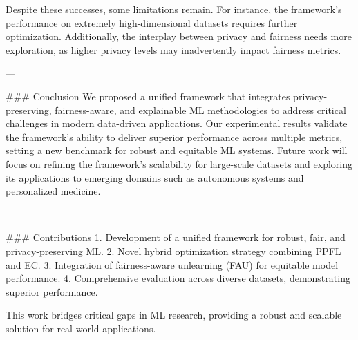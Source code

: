 Despite these successes, some limitations remain. For instance, the framework's performance on extremely high-dimensional datasets requires further optimization. Additionally, the interplay between privacy and fairness needs more exploration, as higher privacy levels may inadvertently impact fairness metrics.

---

### Conclusion  
We proposed a unified framework that integrates privacy-preserving, fairness-aware, and explainable ML methodologies to address critical challenges in modern data-driven applications. Our experimental results validate the framework's ability to deliver superior performance across multiple metrics, setting a new benchmark for robust and equitable ML systems. Future work will focus on refining the framework's scalability for large-scale datasets and exploring its applications to emerging domains such as autonomous systems and personalized medicine.

---

### Contributions  
1. Development of a unified framework for robust, fair, and privacy-preserving ML.  
2. Novel hybrid optimization strategy combining PPFL and EC.  
3. Integration of fairness-aware unlearning (FAU) for equitable model performance.  
4. Comprehensive evaluation across diverse datasets, demonstrating superior performance.  

This work bridges critical gaps in ML research, providing a robust and scalable solution for real-world applications.
